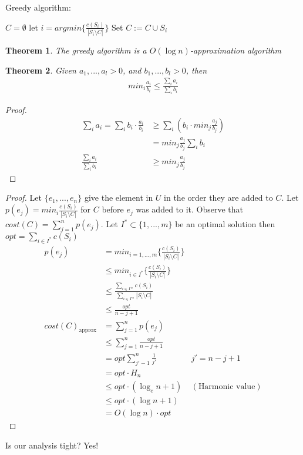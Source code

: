 \documentclass{article}
\theoremstyle{plain}
\newtheorem{thm}{Theorem}
\theoremstyle{definition}
\begin{document}
Greedy algorithm:
\begin{algorithmic}[1]
    \State $C = \emptyset$
        \State let $i = argmin\{\frac{c(S_i)}{|S_i\setminus C|}\}$
        \State Set $C := C \cup S_i$
    \EndWhile
\end{algorithmic}

\begin{thm}
    The greedy algorithm is a $O(\log n)$-approximation algorithm
\end{thm}

\begin{thm}
    Given $a_1, ..., a_l > 0$, and $b_1, ..., b_l > 0$, then
    \begin{align*}
        min_i \frac{a_i}{b_i} \leq \frac{\sum_i a_i}{\sum_i b_i}
    \end{align*}
\end{thm}

\begin{proof}
    \begin{align*}
        \sum_i a_i = \sum_i b_i\cdot\frac{a_i}{b_i} &\geq \sum_i(b_i\cdot
        min_j \frac{a_j}{b_j})\\
        &= min_j\frac{a_j}{b_j}\sum_i b_i\\
        \frac{\sum_i a_i}{\sum_i b_i} &\geq min_j \frac{a_j}{b_j}
    \end{align*}
\end{proof}

\begin{proof}
    Let $\{e_1,..., e_n\}$ give the element in $U$ in the order they are added
    to $C$. Let $p(e_j) = min_i \frac{c(S_i)}{|S_i\setminus C|}$ for $C$ before
    $e_j$ was added to it. Observe that $cost(C) = \sum_{j=1}^n p(e_j)$.
    Let $I^* \subset\{1, ..., m\}$ be an optimal solution then
    $opt = \sum_{i\in I^*} c(S_i)$
    \begin{align*}
        p(e_j) &= min_{i=1, ..., m} \{\frac{c(S_i)}{|S_i\setminus C|}\}\\
        &\leq min_{i\in I^*} \{\frac{c(S_i)}{|S_i\setminus C|}\}\\
        &\leq \frac{\sum_{i\in I*} c(S_i)}{\sum_{i\in I*} |S_i\setminus C|}\\
        &\leq \frac{opt}{n-j+1}\\
        cost(C)_\text{approx} &= \sum_{j=1}^{n}p(e_j)\\
        &\leq \sum_{j=1}^n \frac{opt}{n-j+1}\\
        &= opt\sum^n_{j'-1}\frac{1}{j'} & j' = n-j+1\\
        &= opt\cdot H_n\\
        &\leq opt\cdot(\log_e n +1) & (\text{Harmonic value})\\
        &\leq opt\cdot(\log n + 1)\\
        &= O(\log n)\cdot opt
    \end{align*}
\end{proof}

Is our analysis tight? Yes!
\end{document}
